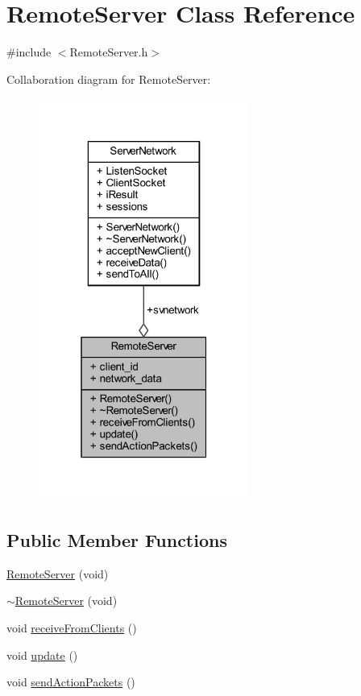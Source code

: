 \hypertarget{class_remote_server}{}\section{Remote\+Server Class Reference}
\label{class_remote_server}


{\ttfamily \#include $<$Remote\+Server.\+h$>$}



Collaboration diagram for Remote\+Server\+:
\nopagebreak
\begin{figure}[H]
\begin{center}
\leavevmode
\includegraphics[width=196pt]{class_remote_server__coll__graph}
\end{center}
\end{figure}
\subsection*{Public Member Functions}
\begin{DoxyCompactItemize}
\item 
\mbox{\hyperlink{class_remote_server_a3b4c9192a1b511a8394febedfb15810a}{Remote\+Server}} (void)
\item 
\mbox{\hyperlink{class_remote_server_ad05c217f363f338dcd05fb319c905f7e}{$\sim$\+Remote\+Server}} (void)
\item 
void \mbox{\hyperlink{class_remote_server_a4e2bc7c80cd666ad3ad9126c3ffee844}{receive\+From\+Clients}} ()
\item 
void \mbox{\hyperlink{class_remote_server_a3db7209565922096aa27128c011c476b}{update}} ()
\item 
void \mbox{\hyperlink{class_remote_server_a5469a07c01cff2b4f33962ad2e9d62e6}{send\+Action\+Packets}} ()
\end{DoxyCompactItemize}
